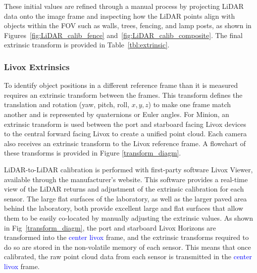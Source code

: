 \documentclass{erauthesis}
\begin{document}
These initial values are refined through a manual process by projecting LiDAR data onto the image frame and inspecting how the LiDAR points align with objects within the \ac{FOV} such as walls, trees, fencing, and lamp posts, as shown in Figures~\ref{fig:LiDAR_calib_fence} and~\ref{fig:LiDAR_calib_composite}.
The final extrinsic transform is provided in Table~\ref{tbl:extrinsic}.

            
\subsubsection{Livox Extrinsics}
To identify object positions in a different reference frame than it is measured requires an extrinsic transform between the frames. 
This transform defines the translation and rotation (yaw, pitch, roll, $x,y,z$) to make one frame match another and is represented by quaternions or Euler angles.
For Minion, an extrinsic transform is used between the port and starboard facing Livox devices to the central forward facing Livox to create a unified point cloud. Each camera also receives an extrinsic transform to the Livox reference frame.
A flowchart of these transforms is provided in Figure \ref{transform_diagm}.



LiDAR-to-LiDAR calibration is performed with first-party software Livox Viewer, available through the manufacturer's website.
This software provides a real-time view of the LiDAR returns and adjustment of the extrinsic calibration for each sensor.
The large flat surfaces of the laboratory, as well as the larger paved area behind the laboratory, both provide excellent large and flat surfaces that allow them to be easily co-located by manually adjusting the extrinsic values.
As shown in Fig~\ref{transform_diagm}, the port and starboard Livox Horizons are transformed into the \textcolor{blue}{center livox} frame, and the extrinsic transforms required to do so are stored in the non-volatile memory of each sensor. This means that once calibrated, the raw point cloud data from each sensor is transmitted in the \textcolor{blue}{center livox} frame.
\end{document}
